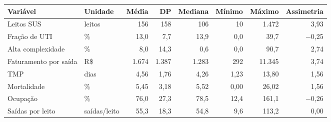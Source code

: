 \begin{tabular}{llrrrrrr}
\toprule
Variável & Unidade & Média & DP & Mediana & Mínimo & Máximo & Assimetria \\
\midrule
Leitos SUS & leitos & 156 & 158 & 106 & 10 & 1.472 & 3,93 \\
Fração de UTI & \% & 13,0 & 7,7 & 13,9 & 0,0 & 39,7 & \ensuremath{-}0,25 \\
Alta complexidade & \% & 8,0 & 14,3 & 0,6 & 0,0 & 90,7 & 2,74 \\
Faturamento por saída & R\$ & 1.674 & 1.387 & 1.283 & 292 & 11.345 & 3,74 \\
TMP & dias & 4,56 & 1,76 & 4,26 & 1,23 & 13,80 & 1,56 \\
Mortalidade & \% & 5,45 & 3,18 & 5,52 & 0,00 & 26,02 & 1,56 \\
Ocupação & \% & 76,0 & 27,3 & 78,5 & 12,4 & 161,1 & \ensuremath{-}0,26 \\
Saídas por leito & saídas/leito & 55,3 & 18,3 & 54,8 & 9,6 & 113,2 & 0,00 \\
\bottomrule
\end{tabular}
